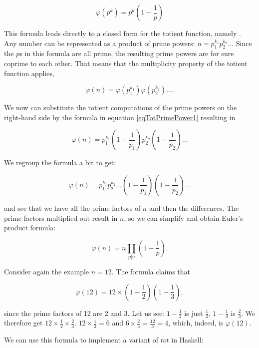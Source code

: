 \documentclass[tikz]{scrreprt}
\newcommand{\Varid}[1]{\mathit{#1}}
\begin{document}
\begin{equation}\label{eqTotPrimePower1}
\varphi\left(p^k\right) = p^k \left(1-\frac{1}{p}\right)
\end{equation}

This formula leads directly to a closed form
for the totient function, namely .
Any number can be represented as a product of prime powers:
$n = p_1^{k_1}p_2^{k_2}\dots$
Since the $p$s in this formula are all prime,
the resulting prime powers are for sure coprime to each other.
That means that the multiplicity property of 
the totient function applies, \ie\ 

\[
\varphi(n) = \varphi\left(p_1^{k_1}\right)\varphi\left(p_2^{k_2}\right)\dots.
\]

We now can substitute the totient computations 
of the prime powers on the right-hand side
by the formula in equation \ref{eqTotPrimePower1}
resulting in 

\[
\varphi(n) = p_1^{k_1}\left(1-\frac{1}{p_1}\right)
             p_2^{k_2}\left(1-\frac{1}{p_2}\right)
             \dots
\]

We regroup the formula a bit to get:

\[
\varphi(n) = p_1^{k_1}p_2^{k_2}\dots
             (1-\frac{1}{p_1})
             \left(1-\frac{1}{p_2}\right)
             \dots
\]

and see that we have all the prime factors of $n$
and then the differences. The prime factors
multiplied out result in $n$, so we can simplify
and obtain Euler's product formula:

\begin{equation}\label{eq:prodForm1}
\varphi(n) = n \prod_{p|n}{\left(1-\frac{1}{p}\right)}.
\end{equation}

Consider again the example $n=12$.
The formula claims that 

\[
\varphi(12) = 12 \times \left(1-\frac{1}{2}\right)
                        \left(1-\frac{1}{3}\right),
\]

since the prime factors of 12 are 2 and 3.
Let us see: $1-\frac{1}{2}$ is just $\frac{1}{2}$,
$1-\frac{1}{3}$ is $\frac{2}{3}$.
We therefore get 
$12 \times \frac{1}{2} \times \frac{2}{3}$.
$12 \times \frac{1}{2} = 6$ and
$6 \times \frac{2}{3} = \frac{12}{3} = 4$,
which, indeed, is $\varphi(12)$.

We can use this formula to implement
a variant of \ensuremath{\Varid{tot}} in Haskell:
\end{document}
